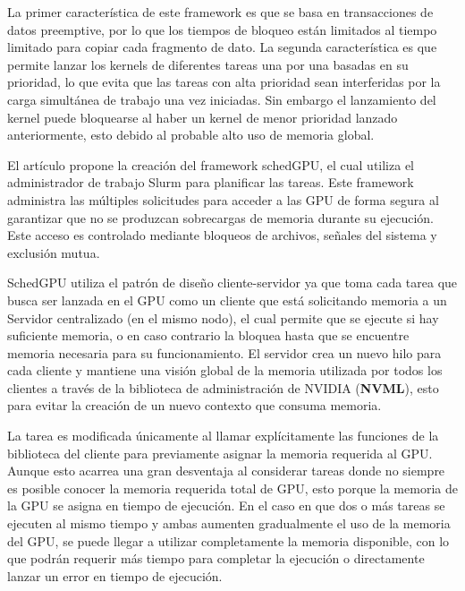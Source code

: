 \begin{enumerate}
	La primer característica de este framework es que se basa en transacciones de datos preemptive, por lo que los tiempos de bloqueo están limitados al tiempo limitado para copiar cada fragmento de dato. La segunda característica es que permite lanzar los kernels de diferentes tareas una por una basadas en su prioridad, lo que evita que las tareas con alta prioridad sean interferidas por la carga simultánea de trabajo una vez iniciadas. Sin embargo el lanzamiento del kernel puede bloquearse al haber un kernel de menor prioridad lanzado anteriormente, esto debido al probable alto uso de memoria global.
	

El artículo \cite{IntraNode} propone la creación del framework schedGPU, el cual utiliza el administrador de trabajo Slurm para planificar las tareas. Este framework administra las múltiples solicitudes para acceder a las GPU de forma segura al garantizar que no se produzcan sobrecargas de memoria durante su ejecución. Este acceso es controlado mediante bloqueos de archivos, señales del sistema y exclusión mutua.

SchedGPU utiliza el patrón de diseño cliente-servidor ya que toma cada tarea que busca ser lanzada en el GPU como un cliente que está solicitando memoria a un Servidor centralizado (en el mismo nodo), el cual permite que se ejecute si hay suficiente memoria, o en caso contrario la bloquea hasta que se encuentre memoria necesaria para su funcionamiento. El servidor crea un nuevo hilo para cada cliente y mantiene una visión global de la memoria utilizada por todos los clientes a través de la biblioteca de administración de NVIDIA (\textbf{NVML}), esto para evitar la creación de un nuevo contexto que consuma memoria.

\vspace{0.3cm}

La tarea es modificada únicamente al llamar explícitamente las funciones de la biblioteca del cliente para previamente asignar la memoria requerida al GPU. Aunque esto acarrea una gran desventaja al considerar tareas donde no siempre es posible conocer la memoria requerida total de GPU, esto porque la memoria de la GPU se asigna en tiempo de ejecución. En el caso en que dos o más tareas se ejecuten al mismo tiempo y ambas aumenten gradualmente el uso de la memoria del GPU, se puede llegar a utilizar completamente la memoria disponible, con lo que podrán requerir más tiempo para completar la ejecución o directamente lanzar un error en tiempo de ejecución.
	

\end{enumerate}
